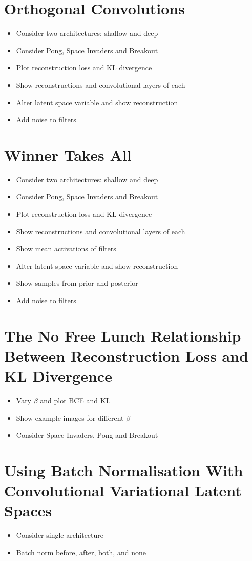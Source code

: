 %
%
%
%
%
\section{Orthogonal Convolutions}
\begin{itemize}
\item Consider two architectures: shallow and deep
\item Consider Pong, Space Invaders and Breakout
\item Plot reconstruction loss and KL divergence
\item Show reconstructions and convolutional layers of each
\item Alter latent space variable and show reconstruction
\item Add noise to filters
\end{itemize}



%
%
%
%
%
\section{Winner Takes All}
\begin{itemize}
\item Consider two architectures: shallow and deep
\item Consider Pong, Space Invaders and Breakout
\item Plot reconstruction loss and KL divergence
\item Show reconstructions and convolutional layers of each
\item Show mean activations of filters
\item Alter latent space variable and show reconstruction
\item Show samples from prior and posterior
\item Add noise to filters
\end{itemize}


%
%
%
%
%
\section{The No Free Lunch Relationship Between Reconstruction Loss and KL Divergence}

\begin{itemize}
\item Vary $\beta$ and plot BCE and KL
\item Show example images for different $\beta$
\item Consider Space Invaders, Pong and Breakout
\end{itemize}

%
%
%
%
%
\section{Using Batch Normalisation With Convolutional Variational Latent Spaces}

\begin{itemize}
\item Consider single architecture 
\item Batch norm before, after, both, and none
\end{itemize}